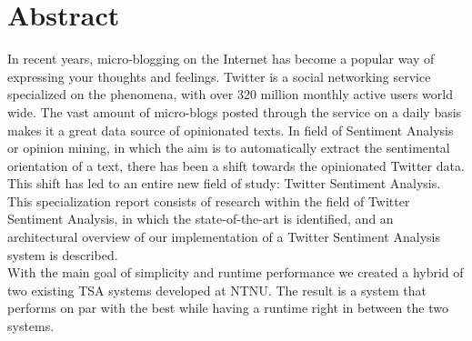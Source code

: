 \section*{Abstract}
In recent years, micro-blogging on the Internet has become a popular way of expressing your thoughts and feelings. Twitter is a social networking service specialized on the phenomena, with over 320 million monthly active users world wide. The vast amount of micro-blogs posted through the service on a daily basis makes it a great data source of opinionated texts. In field of Sentiment Analysis or opinion mining, in which the aim is to automatically extract the sentimental orientation of a text, there has been a shift towards the opinionated Twitter data. This shift has led to an entire new field of study: Twitter Sentiment Analysis. \\

This specialization report consists of research within the field of Twitter Sentiment Analysis, in which the state-of-the-art is identified, and an architectural overview of our implementation of a Twitter Sentiment Analysis system is described. \\

With the main goal of simplicity and runtime performance we created a hybrid of two existing TSA systems developed at NTNU. The result is a system that performs on par with the best while having a runtime right in between the two systems. 

